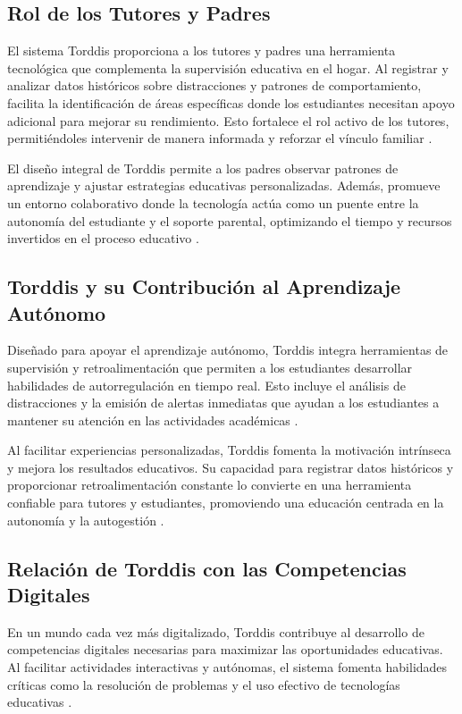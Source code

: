 \documentclass[a4paper,fleqn]{cas-sc}
\begin{document}
		\subsection{Rol de los Tutores y Padres}
			El sistema Torddis proporciona a los tutores y padres una herramienta tecnológica que complementa la supervisión educativa en el hogar. Al registrar y analizar datos históricos sobre distracciones y patrones de comportamiento, facilita la identificación de áreas específicas donde los estudiantes necesitan apoyo adicional para mejorar su rendimiento. Esto fortalece el rol activo de los tutores, permitiéndoles intervenir de manera informada y reforzar el vínculo familiar \citep{Loh2025Plugging,Navarro2024}.
		
			El diseño integral de Torddis permite a los padres observar patrones de aprendizaje y ajustar estrategias educativas personalizadas. Además, promueve un entorno colaborativo donde la tecnología actúa como un puente entre la autonomía del estudiante y el soporte parental, optimizando el tiempo y recursos invertidos en el proceso educativo \citep{Ackermans2025Young}.
				
		\subsection{Torddis y su Contribución al Aprendizaje Autónomo}
			Diseñado para apoyar el aprendizaje autónomo, Torddis integra herramientas de supervisión y retroalimentación que permiten a los estudiantes desarrollar habilidades de autorregulación en tiempo real. Esto incluye el análisis de distracciones y la emisión de alertas inmediatas que ayudan a los estudiantes a mantener su atención en las actividades académicas \citep{Li2024Systematic}.
		
			Al facilitar experiencias personalizadas, Torddis fomenta la motivación intrínseca y mejora los resultados educativos. Su capacidad para registrar datos históricos y proporcionar retroalimentación constante lo convierte en una herramienta confiable para tutores y estudiantes, promoviendo una educación centrada en la autonomía y la autogestión \citep{Ackermans2025Young}.
		
		\subsection{Relación de Torddis con las Competencias Digitales}
			En un mundo cada vez más digitalizado, Torddis contribuye al desarrollo de competencias digitales necesarias para maximizar las oportunidades educativas. Al facilitar actividades interactivas y autónomas, el sistema fomenta habilidades críticas como la resolución de problemas y el uso efectivo de tecnologías educativas \citep{Mohamed2018Implementing,Echeverria2011AFramework}.
		
\end{document}
